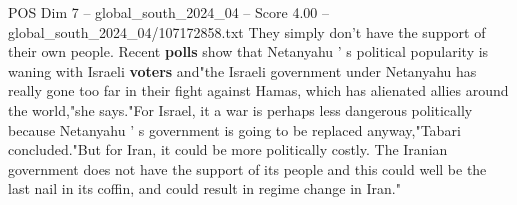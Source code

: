 \begin{textsample}{POS Dim 7 – global\_south\_2024\_04 – Score 4.00 – global\_south\_2024\_04/107172858.txt}
They simply don't have the support of their own people.
Recent \textbf{polls} show that Netanyahu ' s political popularity is waning with Israeli \textbf{voters} and"the Israeli government under Netanyahu has really gone too far in their fight against Hamas, which has alienated allies around the world,"she says."For Israel, it a war is perhaps less dangerous politically because Netanyahu ' s government is going to be replaced anyway,"Tabari concluded."But for Iran, it could be more politically costly.
The Iranian government does not have the support of its people and this could well be the last nail in its coffin, and could result in regime change in Iran."

\end{textsample}
